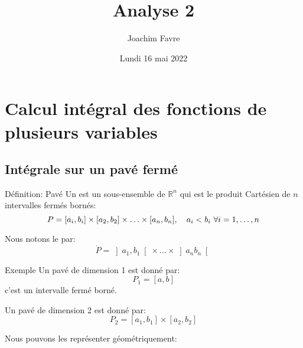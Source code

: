 \documentclass[a4paper]{article}
\title{Analyse 2}
\author{Joachim Favre}
\date{Lundi 16 mai 2022}
\begin{document}
\maketitle

\section[Calcul intégral]{Calcul intégral des fonctions de plusieurs variables}
\subsection{Intégrale sur un pavé fermé}

\begin{parag}{Définition: Pavé}
    Un  est un sous-ensemble de $\mathbb{R}^n$ qui est le produit Cartésien de $n$ intervalles fermés bornés: 
    \[P = \left[a_i, b_i\right] \times \left[a_2, b_2\right] \times \ldots \times \left[a_n, b_n\right], \mathspace a_i < b_i \ \forall i = 1, \ldots, n\]
    
    Nous notons le  par: 
    \[\mathring{P} = \left]a_1, b_1\right[ \times \ldots \times \left]a_n b_n\right[ \]

    \begin{subparag}{Exemple}
        Un pavé de dimension 1 est donné par: 
        \[P_1 = \left[a, b\right]\]
        c'est un intervalle fermé borné.

        Un pavé de dimension 2 est donné par: 
        \[P_2 = \left[a_1, b_1\right] \times \left[a_2, b_2\right]\]
        
        Nous pouvons les représenter géométriquement:
    \end{subparag}
\end{parag}
\end{document}
